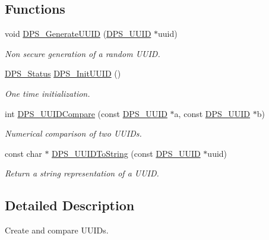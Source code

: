 \subsection*{Functions}
\begin{DoxyCompactItemize}
\item 
void \hyperlink{group__uuid_ga28a9b3d0518c4327afe94d087d1d2322}{D\+P\+S\+\_\+\+Generate\+U\+U\+ID} (\hyperlink{group__uuid_gaef1d03afcc6410602ade1d48f24c3997}{D\+P\+S\+\_\+\+U\+U\+ID} $\ast$uuid)
\begin{DoxyCompactList}\small\item\em Non secure generation of a random U\+U\+ID. \end{DoxyCompactList}\item 
\hyperlink{group__status_ga30395a84d3cad9d4ec29848106415038}{D\+P\+S\+\_\+\+Status} \hyperlink{group__uuid_ga725c154c5fccf2a2c9a6c32353a63228}{D\+P\+S\+\_\+\+Init\+U\+U\+ID} ()
\begin{DoxyCompactList}\small\item\em One time initialization. \end{DoxyCompactList}\item 
int \hyperlink{group__uuid_ga7819e63fac9457f892236b1b3f183713}{D\+P\+S\+\_\+\+U\+U\+I\+D\+Compare} (const \hyperlink{group__uuid_gaef1d03afcc6410602ade1d48f24c3997}{D\+P\+S\+\_\+\+U\+U\+ID} $\ast$a, const \hyperlink{group__uuid_gaef1d03afcc6410602ade1d48f24c3997}{D\+P\+S\+\_\+\+U\+U\+ID} $\ast$b)
\begin{DoxyCompactList}\small\item\em Numerical comparison of two U\+U\+I\+Ds. \end{DoxyCompactList}\item 
const char $\ast$ \hyperlink{group__uuid_ga9c51faa57ecb228ce7eda077a90b20ff}{D\+P\+S\+\_\+\+U\+U\+I\+D\+To\+String} (const \hyperlink{group__uuid_gaef1d03afcc6410602ade1d48f24c3997}{D\+P\+S\+\_\+\+U\+U\+ID} $\ast$uuid)
\begin{DoxyCompactList}\small\item\em Return a string representation of a U\+U\+ID. \end{DoxyCompactList}\end{DoxyCompactItemize}


\subsection{Detailed Description}
Create and compare U\+U\+I\+Ds. 



